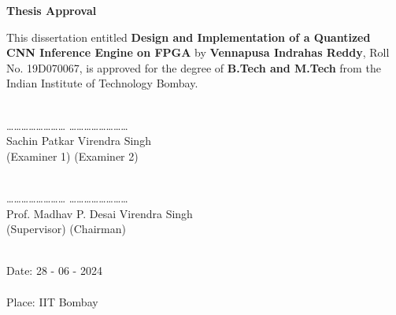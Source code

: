 \documentclass[12pt, a4paper, twoside, openright]{Thesis} %
\begin{document}
{

\vspace{-1in}
\begin{center}
{\Large  {\bf Thesis Approval}}
\end{center}
\vspace*{0.1in} \noindent This dissertation entitled {\large \bf Design and Implementation of a Quantized CNN Inference Engine on FPGA} by {\bf \large
Vennapusa Indrahas Reddy}, Roll No. 19D070067, is approved for the degree of  {\large \bf B.Tech and M.Tech} from the Indian Institute of Technology Bombay.\\\\

\vspace{3cm}

 \ldots\ldots \ldots\ldots \ldots\ldots \ldots\ldots  \hspace{2.5in}  \ldots\ldots \ldots\ldots \ldots\ldots \ldots\ldots \\
 \hspace*{1cm} Sachin Patkar \hspace{3.4in} Virendra Singh\\
 \hspace*{0.9cm} (Examiner 1) \hspace{3.3in} (Examiner 2)\\\\

\vspace{2cm}

 \ldots\ldots \ldots\ldots \ldots\ldots \ldots\ldots  \hspace{2.5in}  \ldots\ldots \ldots\ldots \ldots\ldots \ldots\ldots \\
 \hspace*{0.1cm} Prof. Madhav P. Desai \hspace{2.4in} Virendra Singh\\
 \hspace*{0.9cm} (Supervisor) \hspace{3.39in} (Chairman)\\\\

\vspace{2cm}

\noindent
Date: 28 - 06 - 2024\\\\
Place: IIT Bombay


}
\end{document}
